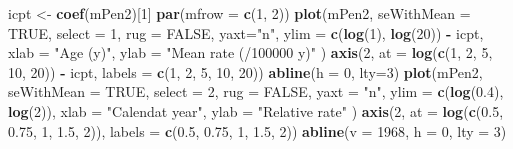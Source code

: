 \documentclass[
]{book}
\newenvironment{Shaded}{\begin{snugshade}}{\end{snugshade}}
\newcommand{\AttributeTok}[1]{\textcolor[rgb]{0.13,0.29,0.53}{#1}}
\newcommand{\ConstantTok}[1]{\textcolor[rgb]{0.56,0.35,0.01}{#1}}
\newcommand{\DecValTok}[1]{\textcolor[rgb]{0.00,0.00,0.81}{#1}}
\newcommand{\FloatTok}[1]{\textcolor[rgb]{0.00,0.00,0.81}{#1}}
\newcommand{\FunctionTok}[1]{\textcolor[rgb]{0.13,0.29,0.53}{\textbf{#1}}}
\newcommand{\NormalTok}[1]{#1}
\newcommand{\OtherTok}[1]{\textcolor[rgb]{0.56,0.35,0.01}{#1}}
\newcommand{\SpecialCharTok}[1]{\textcolor[rgb]{0.81,0.36,0.00}{\textbf{#1}}}
\newcommand{\StringTok}[1]{\textcolor[rgb]{0.31,0.60,0.02}{#1}}
\theoremstyle{definition}
\theoremstyle{definition}
\theoremstyle{definition}
\theoremstyle{definition}
\theoremstyle{remark}
\begin{document}
\begin{Shaded}
\begin{Highlighting}[]
\NormalTok{icpt }\OtherTok{\textless{}{-}} \FunctionTok{coef}\NormalTok{(mPen2)[}\DecValTok{1}\NormalTok{]}
\FunctionTok{par}\NormalTok{(}\AttributeTok{mfrow =} \FunctionTok{c}\NormalTok{(}\DecValTok{1}\NormalTok{, }\DecValTok{2}\NormalTok{))}
\FunctionTok{plot}\NormalTok{(mPen2, }
  \AttributeTok{seWithMean =} \ConstantTok{TRUE}\NormalTok{, }\AttributeTok{select =} \DecValTok{1}\NormalTok{, }\AttributeTok{rug =} \ConstantTok{FALSE}\NormalTok{,}
  \AttributeTok{yaxt=}\StringTok{"n"}\NormalTok{,  }\AttributeTok{ylim =} \FunctionTok{c}\NormalTok{(}\FunctionTok{log}\NormalTok{(}\DecValTok{1}\NormalTok{), }\FunctionTok{log}\NormalTok{(}\DecValTok{20}\NormalTok{)) }\SpecialCharTok{{-}}\NormalTok{ icpt,}
  \AttributeTok{xlab =} \StringTok{"Age (y)"}\NormalTok{, }\AttributeTok{ylab =} \StringTok{"Mean rate (/100000 y)"}
\NormalTok{)}
\FunctionTok{axis}\NormalTok{(}\DecValTok{2}\NormalTok{, }\AttributeTok{at =} \FunctionTok{log}\NormalTok{(}\FunctionTok{c}\NormalTok{(}\DecValTok{1}\NormalTok{, }\DecValTok{2}\NormalTok{, }\DecValTok{5}\NormalTok{, }\DecValTok{10}\NormalTok{, }\DecValTok{20}\NormalTok{)) }\SpecialCharTok{{-}}\NormalTok{ icpt, }
     \AttributeTok{labels =} \FunctionTok{c}\NormalTok{(}\DecValTok{1}\NormalTok{, }\DecValTok{2}\NormalTok{, }\DecValTok{5}\NormalTok{, }\DecValTok{10}\NormalTok{, }\DecValTok{20}\NormalTok{))}
\FunctionTok{abline}\NormalTok{(}\AttributeTok{h =} \DecValTok{0}\NormalTok{, }\AttributeTok{lty=}\DecValTok{3}\NormalTok{)}
\FunctionTok{plot}\NormalTok{(mPen2,}
  \AttributeTok{seWithMean =} \ConstantTok{TRUE}\NormalTok{, }\AttributeTok{select =} \DecValTok{2}\NormalTok{, }\AttributeTok{rug =} \ConstantTok{FALSE}\NormalTok{,}
  \AttributeTok{yaxt =} \StringTok{"n"}\NormalTok{, }\AttributeTok{ylim =} \FunctionTok{c}\NormalTok{(}\FunctionTok{log}\NormalTok{(}\FloatTok{0.4}\NormalTok{), }\FunctionTok{log}\NormalTok{(}\DecValTok{2}\NormalTok{)),}
  \AttributeTok{xlab =} \StringTok{"Calendat year"}\NormalTok{, }\AttributeTok{ylab =} \StringTok{"Relative rate"}
\NormalTok{)}
\FunctionTok{axis}\NormalTok{(}\DecValTok{2}\NormalTok{, }\AttributeTok{at =} \FunctionTok{log}\NormalTok{(}\FunctionTok{c}\NormalTok{(}\FloatTok{0.5}\NormalTok{, }\FloatTok{0.75}\NormalTok{, }\DecValTok{1}\NormalTok{, }\FloatTok{1.5}\NormalTok{, }\DecValTok{2}\NormalTok{)), }
     \AttributeTok{labels =} \FunctionTok{c}\NormalTok{(}\FloatTok{0.5}\NormalTok{, }\FloatTok{0.75}\NormalTok{, }\DecValTok{1}\NormalTok{, }\FloatTok{1.5}\NormalTok{, }\DecValTok{2}\NormalTok{))}
\FunctionTok{abline}\NormalTok{(}\AttributeTok{v =} \DecValTok{1968}\NormalTok{, }\AttributeTok{h =} \DecValTok{0}\NormalTok{, }\AttributeTok{lty =} \DecValTok{3}\NormalTok{)}
\end{Highlighting}
\end{Shaded}
\end{document}
